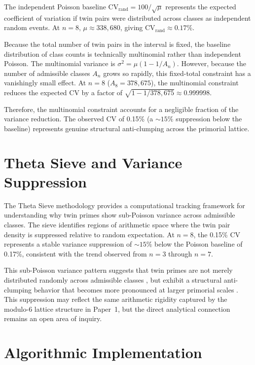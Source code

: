 \documentclass[11pt]{article}
\begin{document}
The independent Poisson baseline CV$_{\text{rand}} = 100/\sqrt{\mu}$ represents the expected coefficient of variation if twin pairs were distributed across classes as independent random events. At $n=8$, $\mu \approx 338{,}680$, giving CV$_{\text{rand}} \approx 0.17\%$. 

Because the total number of twin pairs in the interval is fixed, the baseline distribution of class counts is technically multinomial rather than independent Poisson. The multinomial variance is $\sigma^2 = \mu(1 - 1/A_n)$. However, because the number of admissible classes $A_n$ grows so rapidly, this fixed-total constraint has a vanishingly small effect. At $n=8$ ($A_8 = 378{,}675$), the multinomial constraint reduces the expected CV by a factor of $\sqrt{1 - 1/378{,}675} \approx 0.999998$. 

Therefore, the multinomial constraint accounts for a negligible fraction of the variance reduction. The observed CV of 0.15\% (a $\sim 15\%$ suppression below the baseline) represents genuine structural anti-clumping across the primorial lattice.

\section{Theta Sieve and Variance Suppression}
\label{sec:theta}

The Theta Sieve methodology provides a computational tracking framework for understanding why twin primes show sub-Poisson variance across admissible classes. The sieve identifies regions of arithmetic space where the twin pair density is suppressed relative to random expectation. At $n=8$, the 0.15\% CV represents a stable variance suppression of $\sim 15\%$ below the Poisson baseline of 0.17\%, consistent with the trend observed from $n=3$ through $n=7$.

This sub-Poisson variance pattern suggests that twin primes are not merely distributed randomly across admissible classes \cite{Bre14}, but exhibit a structural anti-clumping behavior that becomes more pronounced at larger primorial scales \cite{Mai85}. This suppression may reflect the same arithmetic rigidity captured by the modulo-6 lattice structure in Paper~1, but the direct analytical connection remains an open area of inquiry.

\section{Algorithmic Implementation}
\label{sec:implementation}
\end{document}
